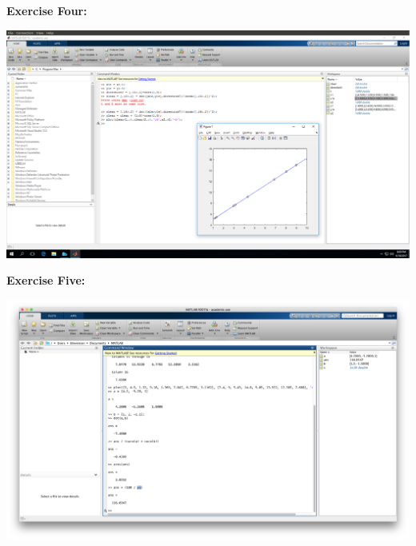 \documentclass[11pt]{article}
\begin{document}
\noindent\textbf{Exercise Four:}

\noindent\includegraphics[scale=0.25]{Four} \\

\newpage

\noindent\textbf{Exercise Five:}

\noindent\includegraphics[scale=0.25]{Five}
\end{document}
